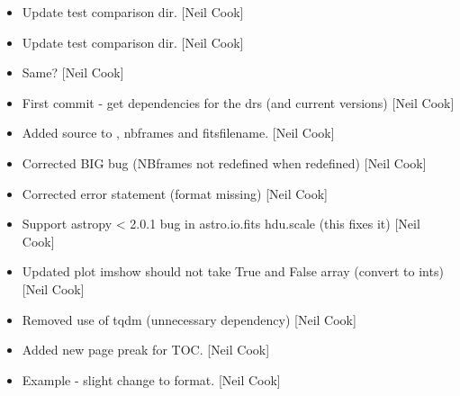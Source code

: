 \documentclass[a4paper,10pt,english]{report}
\begin{document}
\begin{itemize}
\item {} 
Update test comparison dir. {[}Neil Cook{]}

\item {} 
Update test comparison dir. {[}Neil Cook{]}

\item {} 
Same? {[}Neil Cook{]}

\item {} 
First commit - get dependencies for the drs (and current versions)
{[}Neil Cook{]}

\item {} 
Added source to , nbframes and fitsfilename. {[}Neil Cook{]}

\item {} 
Corrected BIG bug (NBframes not redefined when 
redefined) {[}Neil Cook{]}

\item {} 
Corrected error statement (format missing) {[}Neil Cook{]}

\item {} 
Support astropy \textless{} 2.0.1 bug in astro.io.fits hdu.scale (this fixes it)
{[}Neil Cook{]}

\item {} 
Updated plot imshow should not take True and False array (convert to
ints) {[}Neil Cook{]}

\item {} 
Removed use of tqdm (unnecessary dependency) {[}Neil Cook{]}

\item {} 
Added new page preak for TOC. {[}Neil Cook{]}

\item {} 
Example - slight change to format. {[}Neil Cook{]}

\end{itemize}
\end{document}
